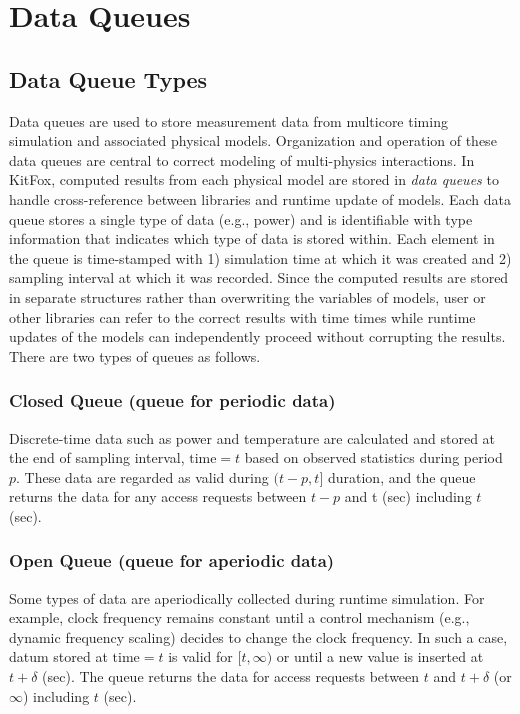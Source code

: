 \section{Data Queues} \label{sec:data_queues}
\subsection{Data Queue Types}
\noindent
Data queues are used to store measurement data from multicore timing simulation and associated physical models. 
Organization and operation of these data queues are central to correct modeling of multi-physics interactions. 
In KitFox, computed results from each physical model are stored in \emph{data queues} to handle cross-reference between libraries and runtime update of models. 
Each data queue stores a single type of data (e.g., power) and is identifiable with type information that indicates which type of data is stored within. 
Each element in the queue is time-stamped with 1) simulation time at which it was created and 2) sampling interval at which it was recorded. 
Since the computed results are stored in separate structures rather than overwriting the variables of models, user or other libraries can refer to the correct results with time times while runtime updates of the models can independently proceed without corrupting the results. 
There are two types of queues as follows.

\subsubsection{Closed Queue (queue for periodic data)} \label{subsubsec:closed_queue}
\noindent
Discrete-time data such as power and temperature are calculated and stored at the end of sampling interval, $\text{time} = t$ based on observed statistics during period $p$. 
These data are regarded as valid during $(t − p, t]$ duration, and the queue returns the data for any access requests between $t − p$ and t (sec) including $t$ (sec).

\subsubsection{Open Queue (queue for aperiodic data)} \label{subsubsec:open_queue}
\noindent
Some types of data are aperiodically collected during runtime simulation. 
For example, clock frequency remains constant until a control mechanism (e.g., dynamic frequency scaling) decides to change the clock frequency. 
In such a case, datum stored at $\text{time} = t$ is valid for $[t, \infty)$ or until a new value is inserted at $t + \delta$ (sec). The queue returns the data for access requests between $t$ and $t + \delta$ (or $\infty$) including $t$ (sec).

